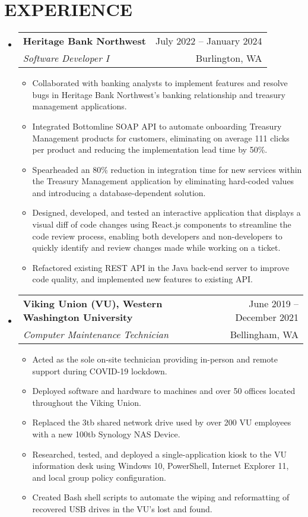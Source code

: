 \documentclass[letterpaper,11pt]{article}
\makeatletter
\newcommand{\resumeItem}[1]{
    \item\small{
            {#1 \vspace{-1pt}}
        }
    }
\newcommand{\resumeSubheading}[4]{
        \vspace{-1pt}\item
        \begin{tabular*}{\textwidth}[t]{l@{\extracolsep{\fill}}r}
            \textbf{#1} & {\color{dark-grey}\small #2}\vspace{1pt}\\ %
            \textit{#3} & {\color{dark-grey} \small #4}\\ %
        \end{tabular*}\vspace{-4pt}
    }
\newcommand{\resumeSubHeadingListStart}{\begin{itemize}[leftmargin=0in, label={}]}
\newcommand{\resumeSubHeadingListEnd}{\end{itemize}}
\newcommand{\resumeItemListStart}{\begin{itemize}}
\newcommand{\resumeItemListEnd}{\end{itemize}\vspace{0pt}}
\makeatother
\begin{document}
\section{EXPERIENCE}
\resumeSubHeadingListStart

\resumeSubheading
{Heritage Bank Northwest}{July 2022 -- January 2024}
{Software Developer I}{Burlington, WA}
\resumeItemListStart
\resumeItem{Collaborated with banking analysts to implement features and resolve bugs in Heritage Bank Northwest's banking relationship and treasury management applications.}
\resumeItem{Integrated Bottomline SOAP API to automate onboarding Treasury Management products for customers, eliminating on average 111 clicks per product and reducing the implementation lead time by 50\%.}
\resumeItem{Spearheaded an 80\% reduction in integration time for new services within the Treasury Management application by eliminating hard-coded values and introducing a database-dependent solution.}
\resumeItem{Designed, developed, and tested an interactive application that displays a visual diff of code changes using React.js components to streamline the code review process, enabling both developers and non-developers to quickly identify and review changes made while working on a ticket.}
\resumeItem{Refactored existing REST API in the Java back-end server to improve code quality, and implemented new features to existing API.}
\resumeItemListEnd

\resumeSubheading
{Viking Union (VU), Western Washington University}{June 2019 -- December 2021}
{Computer Maintenance Technician}{Bellingham, WA}
\resumeItemListStart
\resumeItem{Acted as the sole on-site technician providing in-person and remote support during COVID-19 lockdown.}
\resumeItem{Deployed software and hardware to machines and over 50 offices located throughout the Viking Union.}
\resumeItem{Replaced the 3tb shared network drive used by over 200 VU employees with a new 100tb Synology NAS Device.}
\resumeItem{Researched, tested, and deployed a single-application kiosk to the VU information desk using Windows 10, PowerShell, Internet Explorer 11, and local group policy configuration.}
\resumeItem{Created Bash shell scripts to automate the wiping and reformatting of recovered USB drives in the VU’s lost and found.}
\resumeItemListEnd

\resumeSubHeadingListEnd


\end{document}
